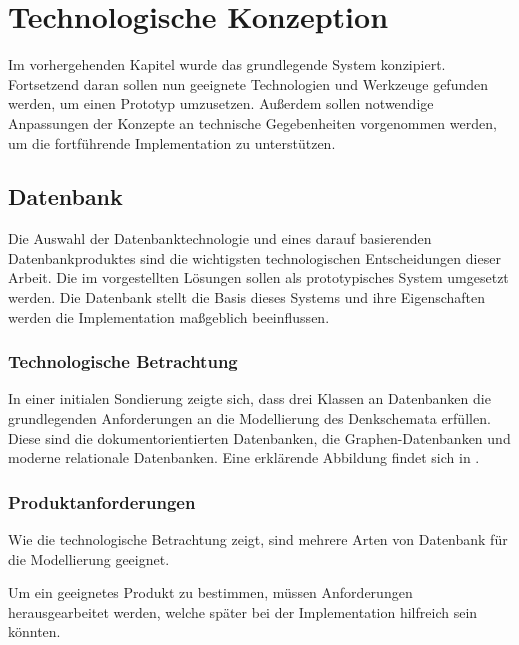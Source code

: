 \chapter{Technologische Konzeption}
\label{cha:tech}

Im vorhergehenden Kapitel wurde das grundlegende System konzipiert.
Fortsetzend daran sollen nun geeignete Technologien und Werkzeuge gefunden werden,
um einen Prototyp umzusetzen.
Außerdem sollen notwendige Anpassungen der Konzepte an technische Gegebenheiten vorgenommen werden,
um die fortf\"uhrende Implementation zu unterst\"utzen.





\section{Datenbank}
\label{sec:tech:db}

Die Auswahl der Datenbanktechnologie und eines darauf basierenden Datenbankproduktes sind die wichtigsten technologischen Entscheidungen dieser Arbeit.
Die im  vorgestellten Lösungen sollen als prototypisches System umgesetzt werden.
Die Datenbank stellt die Basis dieses Systems und ihre Eigenschaften werden die Implementation maßgeblich beeinflussen.


\subsection{Technologische Betrachtung}

In einer initialen Sondierung zeigte sich,
dass drei Klassen an Datenbanken die grundlegenden Anforderungen an die Modellierung des Denkschemata erfüllen.
Diese sind die dokumentorientierten Datenbanken, die Graphen-Datenbanken und moderne relationale Datenbanken. 
Eine erklärende Abbildung findet sich in .

\subsection{Produktanforderungen}

Wie die technologische Betrachtung zeigt,
sind mehrere Arten von Datenbank für die Modellierung geeignet.

Um ein geeignetes Produkt zu bestimmen,
m\"ussen Anforderungen herausgearbeitet werden,
welche sp\"ater bei der Implementation hilfreich sein k\"onnten.

